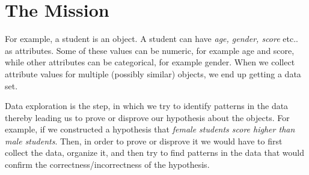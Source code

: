 \documentclass[12pt]{book}\usepackage{knitr}
\begin{document}
\section{The Mission}
\begin{HIGHLIGHT}
\par{}
\end{HIGHLIGHT}
\begin{HIGHLIGHT}
\par{}
\end{HIGHLIGHT}

\noindent For example, a student is an object. A student can have \emph{age, gender, score} etc.. as attributes. Some of these values can be numeric, for example age and score, while other attributes can be categorical, for example gender.  When we collect attribute values for multiple (possibly similar) objects, we end up getting a data set. 
\begin{HIGHLIGHT}
\par{}
\end{HIGHLIGHT}

\noindent Data exploration is the step, in which we try to identify patterns in the data thereby leading us to prove or disprove our hypothesis about the objects. For example, if we constructed a hypothesis that \emph{female students score higher than male students}. Then, in order to prove or disprove it we would have to first collect the data, organize it, and then try to find patterns in the data that would confirm the correctness/incorrectness of the hypothesis.  
\end{document}
